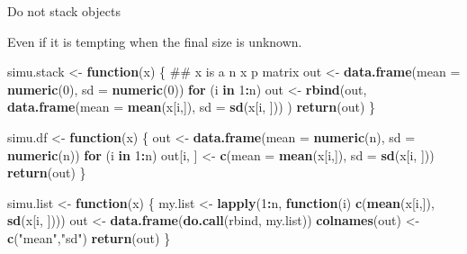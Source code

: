 \documentclass[10pt,ignorenonframetext,]{beamer}
\newenvironment{Shaded}{\begin{snugshade}}{\end{snugshade}}
\newcommand{\KeywordTok}[1]{\textcolor[rgb]{0.13,0.29,0.53}{\textbf{#1}}}
\newcommand{\DataTypeTok}[1]{\textcolor[rgb]{0.13,0.29,0.53}{#1}}
\newcommand{\DecValTok}[1]{\textcolor[rgb]{0.00,0.00,0.81}{#1}}
\newcommand{\StringTok}[1]{\textcolor[rgb]{0.31,0.60,0.02}{#1}}
\newcommand{\ControlFlowTok}[1]{\textcolor[rgb]{0.13,0.29,0.53}{\textbf{#1}}}
\newcommand{\OperatorTok}[1]{\textcolor[rgb]{0.81,0.36,0.00}{\textbf{#1}}}
\newcommand{\NormalTok}[1]{#1}
\begin{document}
\begin{frame}{Do not stack objects}

Even if it is tempting when the final size is unknown.

\scriptsize

\begin{Shaded}
\begin{Highlighting}[]
\NormalTok{simu.stack <-}\StringTok{ }\ControlFlowTok{function}\NormalTok{(x) \{ ## x is a n x p matrix}
\NormalTok{  out <-}\StringTok{ }\KeywordTok{data.frame}\NormalTok{(}\DataTypeTok{mean =} \KeywordTok{numeric}\NormalTok{(}\DecValTok{0}\NormalTok{), }\DataTypeTok{sd =} \KeywordTok{numeric}\NormalTok{(}\DecValTok{0}\NormalTok{))}
  \ControlFlowTok{for}\NormalTok{ (i }\ControlFlowTok{in} \DecValTok{1}\OperatorTok{:}\NormalTok{n) }
\NormalTok{    out <-}\StringTok{ }\KeywordTok{rbind}\NormalTok{(out, }\KeywordTok{data.frame}\NormalTok{(}\DataTypeTok{mean =} \KeywordTok{mean}\NormalTok{(x[i,]), }\DataTypeTok{sd =} \KeywordTok{sd}\NormalTok{(x[i, ])) )}
  \KeywordTok{return}\NormalTok{(out)}
\NormalTok{\}}

\NormalTok{simu.df <-}\StringTok{ }\ControlFlowTok{function}\NormalTok{(x) \{}
\NormalTok{  out <-}\StringTok{ }\KeywordTok{data.frame}\NormalTok{(}\DataTypeTok{mean =} \KeywordTok{numeric}\NormalTok{(n), }\DataTypeTok{sd =} \KeywordTok{numeric}\NormalTok{(n))}
  \ControlFlowTok{for}\NormalTok{ (i }\ControlFlowTok{in} \DecValTok{1}\OperatorTok{:}\NormalTok{n)}
\NormalTok{    out[i, ] <-}\StringTok{ }\KeywordTok{c}\NormalTok{(}\DataTypeTok{mean =} \KeywordTok{mean}\NormalTok{(x[i,]), }\DataTypeTok{sd =} \KeywordTok{sd}\NormalTok{(x[i, ])) }
  \KeywordTok{return}\NormalTok{(out)}
\NormalTok{\}}

\NormalTok{simu.list <-}\StringTok{ }\ControlFlowTok{function}\NormalTok{(x) \{}
\NormalTok{  my.list <-}\StringTok{ }\KeywordTok{lapply}\NormalTok{(}\DecValTok{1}\OperatorTok{:}\NormalTok{n, }\ControlFlowTok{function}\NormalTok{(i) }\KeywordTok{c}\NormalTok{(}\KeywordTok{mean}\NormalTok{(x[i,]), }\KeywordTok{sd}\NormalTok{(x[i, ])))}
\NormalTok{  out <-}\StringTok{ }\KeywordTok{data.frame}\NormalTok{(}\KeywordTok{do.call}\NormalTok{(rbind, my.list))}
  \KeywordTok{colnames}\NormalTok{(out) <-}\StringTok{ }\KeywordTok{c}\NormalTok{(}\StringTok{"mean"}\NormalTok{,}\StringTok{"sd"}\NormalTok{)  }
  \KeywordTok{return}\NormalTok{(out)}
\NormalTok{\}}
\end{Highlighting}
\end{Shaded}


\end{frame}
\end{document}
